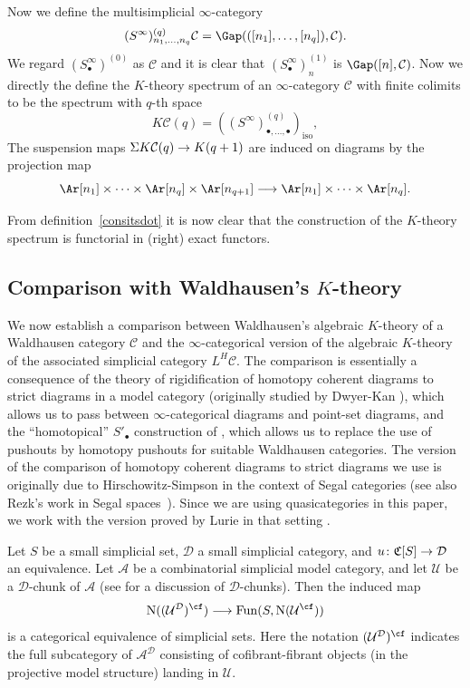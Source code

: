 \documentclass{amsart}
\newcommand{\ssdot}{\bullet}%
\newcommand{\seqdot}{\bullet,\dotsc,\bullet}
\newcommand{\Spdot}[1][\ssdot]{S'_{#1}}
\newcommand{\iSdot}[1][\ssdot]{S^{\infty}_{#1}}
\newcommand{\iSdotq}[1][\seqdot]{(S^{\infty})^{(q)}_{#1}}
\renewcommand{\to}{\mathchoice{\longrightarrow}{\rightarrow}{\rightarrow}{\rightarrow}}
\let\catsymbfont\mathcal
\newcommand{\aA}{{\catsymbfont{A}}}
\newcommand{\aC}{{\catsymbfont{C}}}
\newcommand{\aD}{{\catsymbfont{D}}}
\newcommand{\aU}{{\catsymbfont{U}}}
\newcommand{\lkan}[1]{(#1)_{\mathrm{iso}}}
\newcommand{\N}{\mathrm{N}}
\newcommand{\Fun}{\mathrm{Fun}} %
\renewcommand{\i}{\infty}
\numberwithin{equation}{section}
\theoremstyle{definition}
\begin{document}
Now we define the multisimplicial $\i$-category
\[
\iSdotq[n_{1},\dotsc,n_{q}]\aC = \Gap(([n_1],\dotsc,[n_q]), \aC).\]
We regard $(\iSdot)^{(0)}$ as $\aC$ and it is clear that
$(\iSdot)^{(1)}_n$ is $\Gap([n],\aC)$.  Now we directly the define the
$K$-theory spectrum of an $\i$-category $\aC$ with finite colimits to
be the spectrum with $q$-th space
\[
K\aC(q)= \lkan{\iSdotq},
\]
The suspension maps $\Sigma K\aC(q)\to K(q+1)$ are induced on diagrams
by the projection map
\[
\Ar[n_{1}]\times \dotsb \times \Ar[n_{q}]\times \Ar[n_{q+1}]\to
\Ar[n_{1}]\times \dotsb \times \Ar[n_{q}].
\]

From definition~\ref{consitsdot} it is now clear that the construction
of the $K$-theory spectrum is functorial in (right) exact functors. 

\subsection{Comparison with Waldhausen's $K$-theory}\label{sub:comparison}

We now establish a comparison between Waldhausen's algebraic
$K$-theory of a Waldhausen category $\aC$ and the $\i$-categorical
version of the algebraic $K$-theory of the associated simplicial
category $L^H \aC$.  The comparison is essentially a consequence of
the theory of rigidification of homotopy coherent diagrams to strict
diagrams in a model category (originally studied by
Dwyer-Kan \cite{DKdiagrams}), which allows us to pass between
$\i$-categorical diagrams and point-set diagrams, and the
``homotopical'' $\Spdot$ construction of \cite{BM3}, which allows us
to replace the use of pushouts by homotopy pushouts for suitable
Waldhausen categories.
The version of the comparison of homotopy coherent diagrams to strict
diagrams we use is originally due to
Hirschowitz-Simpson \cite{HirschowitzSimpson} in the context of Segal
categories (see also Rezk's work in Segal spaces~\cite[8.12]{Rezk}).
Since we are using quasicategories in this paper, we work with the
version proved by Lurie in that setting \cite[4.2.4.4]{HTT}.

Let $S$ be a small simplicial set, $\aD$ a small simplicial category, and
$u \colon \mathfrak{C}[S] \to \aD$ an equivalence.  Let $\aA$ be a
combinatorial simplicial model category, and let $\aU$ be a
$\aD$-chunk of $\aA$ (see \cite[A.3.4.9]{HTT} for a discussion of
$\aD$-chunks).  Then the induced map
\[
\N((\aU^{\aD})^{\cf}) \to \Fun(S, \N(\aU^{\cf}))
\]
is a categorical equivalence of simplicial sets.  Here the notation
$(\aU^{\aD})^{\cf}$ indicates the full subcategory of $\aA^{\aD}$
consisting of cofibrant-fibrant objects (in the projective model
structure) landing in $\aU$.
\end{document}

